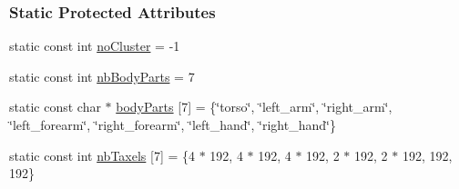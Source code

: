 \subsubsection*{Static Protected Attributes}
\begin{DoxyCompactItemize}
\item 
static const int \hyperlink{group__touchDetector_ae172aa9ba20fca535350d3c61d21e329}{no\+Cluster} = -\/1
\item 
static const int \hyperlink{group__touchDetector_af2e69c2ccd1b3a837c6c2647f830377f}{nb\+Body\+Parts} = 7
\item 
static const char $\ast$ \hyperlink{group__touchDetector_ad6dc756a8cda3b2ae8effda5f5db8b60}{body\+Parts} \mbox{[}7\mbox{]} = \{\char`\"{}torso\char`\"{}, \char`\"{}left\+\_\+arm\char`\"{}, \char`\"{}right\+\_\+arm\char`\"{}, \char`\"{}left\+\_\+forearm\char`\"{}, \char`\"{}right\+\_\+forearm\char`\"{}, \char`\"{}left\+\_\+hand\char`\"{}, \char`\"{}right\+\_\+hand\char`\"{}\}
\item 
static const int \hyperlink{group__touchDetector_a2f529960e33051588b398f964cd0176e}{nb\+Taxels} \mbox{[}7\mbox{]} = \{4 $\ast$ 192, 4 $\ast$ 192, 4 $\ast$ 192, 2 $\ast$ 192, 2 $\ast$ 192, 192, 192\}
\end{DoxyCompactItemize}


